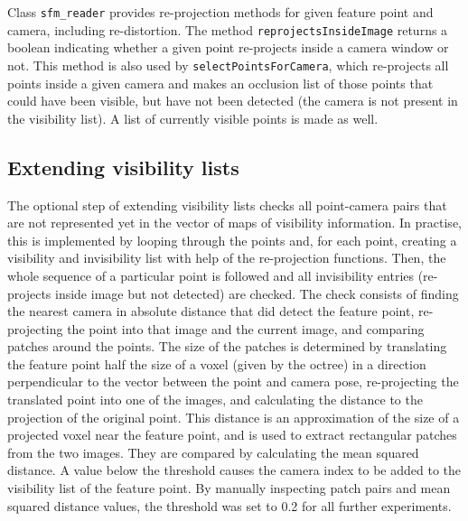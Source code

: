 Class \texttt{sfm\_reader} provides re-projection methods for given feature point and camera, including re-distortion. The method \texttt{reprojectsInsideImage} returns a boolean indicating whether a given point re-projects inside a camera window or not. This method is also used by \texttt{selectPointsForCamera}, which re-projects all points inside a given camera and makes an occlusion list of those points that could have been visible, but have not been detected (\ie the camera is not present in the visibility list). A list of currently visible points is made as well.

\subsection{Extending visibility lists}
The optional step of extending visibility lists checks all point-camera pairs that are not represented yet in the vector of maps of visibility information. In practise, this is implemented by looping through the points and, for each point, creating a visibility and invisibility list with help of the re-projection functions. Then, the whole sequence of a particular point is followed and all invisibility entries (re-projects inside image but not detected) are checked. The check consists of finding the nearest camera in absolute distance that did detect the feature point, re-projecting the point into that image and the current image, and comparing patches around the points. The size of the patches is determined by translating the feature point half the size of a voxel (given by the octree) in a direction perpendicular to the vector between the point and camera pose, re-projecting the translated point into one of the images, and calculating the distance to the projection of the original point. This distance is an approximation of the size of a projected voxel near the feature point, and is used to extract rectangular patches from the two images. They are compared by calculating the mean squared distance. A value below the threshold causes the camera index to be added to the visibility list of the feature point. By manually inspecting patch pairs and mean squared distance values, the threshold was set to 0.2 for all further experiments.

